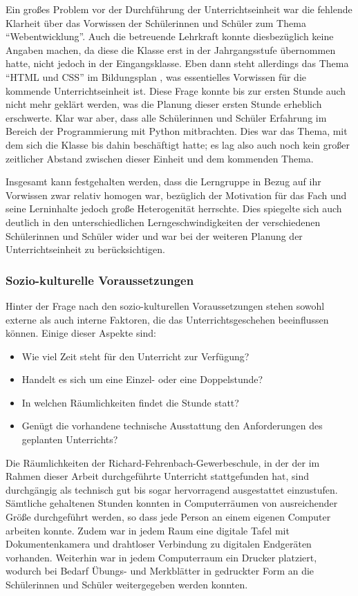 Ein großes Problem vor der Durchführung der Unterrichtseinheit war die fehlende Klarheit über das Vorwissen der Schülerinnen und Schüler zum Thema ``Webentwicklung''.
Auch die betreuende Lehrkraft konnte diesbezüglich keine Angaben machen, da diese die Klasse erst in der Jahrgangsstufe übernommen hatte, nicht jedoch in der Eingangsklasse.
Eben dann steht allerdings das Thema ``HTML und CSS'' im Bildungsplan \cite[BPE~2]{bildungsplan-tg-informatik}, was essentielles Vorwissen für die kommende Unterrichtseinheit ist.
Diese Frage konnte bis zur ersten Stunde auch nicht mehr geklärt werden, was die Planung dieser ersten Stunde erheblich erschwerte.
Klar war aber, dass alle Schülerinnen und Schüler Erfahrung im Bereich der Programmierung mit Python mitbrachten.
Dies war das Thema, mit dem sich die Klasse bis dahin beschäftigt hatte; es lag also auch noch kein großer zeitlicher Abstand zwischen dieser Einheit und dem kommenden Thema.

Insgesamt kann festgehalten werden, dass die Lerngruppe in Bezug auf ihr Vorwissen zwar relativ homogen war, bezüglich der Motivation für das Fach und seine Lerninhalte jedoch große Heterogenität herrschte.
Dies spiegelte sich auch deutlich in den unterschiedlichen Lerngeschwindigkeiten der verschiedenen Schülerinnen und Schüler wider und war bei der weiteren Planung der Unterrichtseinheit zu berücksichtigen.

\subsubsection{Sozio-kulturelle Voraussetzungen}
\label{subsubsec:sozio-kulturelle-voraussetzungen}

Hinter der Frage nach den sozio-kulturellen Voraussetzungen stehen sowohl externe als auch interne Faktoren, die das Unterrichtsgeschehen beeinflussen können.
Einige dieser Aspekte sind:
\begin{itemize}
	\item Wie viel Zeit steht für den Unterricht zur Verfügung?
	\item Handelt es sich um eine Einzel- oder eine Doppelstunde?
	\item In welchen Räumlichkeiten findet die Stunde statt?
	\item Genügt die vorhandene technische Ausstattung den Anforderungen des geplanten Unterrichts?
\end{itemize}
Die Räumlichkeiten der Richard-Fehrenbach-Gewerbeschule, in der der im Rahmen dieser Arbeit durchgeführte Unterricht stattgefunden hat, sind durchgängig als technisch gut bis sogar hervorragend ausgestattet einzustufen.
Sämtliche gehaltenen Stunden konnten in Computerräumen von ausreichender Größe durchgeführt werden, so dass jede Person an einem eigenen Computer arbeiten konnte.
Zudem war in jedem Raum eine digitale Tafel mit Dokumentenkamera und drahtloser Verbindung zu digitalen Endgeräten vorhanden.
Weiterhin war in jedem Computerraum ein Drucker platziert, wodurch bei Bedarf Übungs- und Merkblätter in gedruckter Form an die Schülerinnen und Schüler weitergegeben werden konnten.

